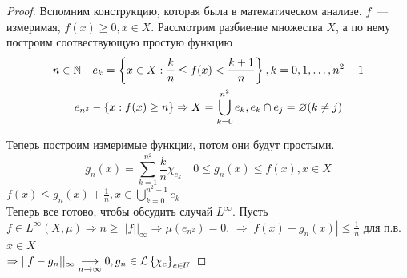 \documentclass[document]{subfiles}
\begin{document}
\begin{proof}
    Вспомним конструкцию, которая была в математическом анализе. $f$~--- измеримая, $f(x) \geq 0, x \in X$.
    Рассмотрим разбиение множества $X$, а по нему построим соотвествующую простую функцию
    \begin{gather*}
        n \in \mathbb{N} \quad e_k = \left\{x \in X: \frac{k}{n} \leq f(x) < \frac{k+1}{n}\right\}, k = 0, 1, \ldots, n^2 - 1 \\
        e_{n^2} - \left\{x: f(x) \geq n\right\} \Rightarrow X = \bigcup^{n^2}_{k=0} e_k, e_k \cap e_j = \varnothing (k \ne j)
    \end{gather*}

    Теперь построим измеримые функции, потом они будут простыми.
    \[g_n(x) = \sum^{n^2}_{k=1} \frac{k}{n} \chi_{e_k} \quad 0 \leq g_n(x) \leq f(x), x \in X \]
    $f(x) \leq g_n(x) + \frac{1}{n}, x \in \bigcup^{n^2-1}_{k=0} e_k$ \\

    Теперь все готово, чтобы обсудить случай $L^\infty$. Пусть $f \in L^\infty(X,\mu) \Rightarrow n \geq ||f||_\infty \Rightarrow \mu(e_{n^2}) = 0 $.
    $\Rightarrow |f(x) - g_n(x)| \leq \frac{1}{n}$ для п.в. $x \in X$ \\
    $\Rightarrow ||f-g_n||_\infty \underset{n \to \infty}{\longrightarrow} 0, g_n \in \mathcal{L} \left\{\chi_e\right\}_{e \in U}$


\end{proof}
\end{document}
